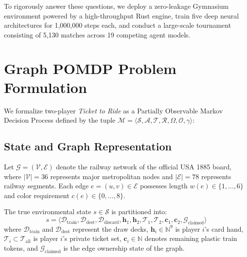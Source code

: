 \documentclass[conference,10pt]{IEEEtran}
\begin{document}
To rigorously answer these questions, we deploy a zero-leakage Gymnasium environment powered by a high-throughput Rust engine, train five deep neural architectures for 1,000,000 steps each, and conduct a large-scale tournament consisting of 5,130 matches across 19 competing agent models.

\section{Graph POMDP Problem Formulation}
\label{sec:formulation}
We formalize two-player \textit{Ticket to Ride} as a Partially Observable Markov Decision Process defined by the tuple $\mathcal{M} = \langle \mathcal{S}, \mathcal{A}, \mathcal{T}, \mathcal{R}, \Omega, \mathcal{O}, \gamma \rangle$:

\subsection{State and Graph Representation}
Let $\mathcal{G} = (\mathcal{V}, \mathcal{E})$ denote the railway network of the official USA 1885 board, where $|\mathcal{V}| = 36$ represents major metropolitan nodes and $|\mathcal{E}| = 78$ represents railway segments. Each edge $e = (u, v) \in \mathcal{E}$ possesses length $w(e) \in \{1, \dots, 6\}$ and color requirement $c(e) \in \{0, \dots, 8\}$.

The true environmental state $s \in \mathcal{S}$ is partitioned into:
\begin{equation}
s = \langle \mathcal{D}_{\text{train}}, \mathcal{D}_{\text{dest}}, \mathcal{D}_{\text{discard}}, \mathbf{h}_1, \mathbf{h}_2, \mathcal{T}_1, \mathcal{T}_2, \mathbf{c}_1, \mathbf{c}_2, \mathcal{G}_{\text{claimed}} \rangle
\end{equation}
where $\mathcal{D}_{\text{train}}$ and $\mathcal{D}_{\text{dest}}$ represent the draw decks, $\mathbf{h}_i \in \mathbb{N}^9$ is player $i$'s card hand, $\mathcal{T}_i \subset \mathcal{T}_{\text{all}}$ is player $i$'s private ticket set, $\mathbf{c}_i \in \mathbb{N}$ denotes remaining plastic train tokens, and $\mathcal{G}_{\text{claimed}}$ is the edge ownership state of the graph.
\end{document}

